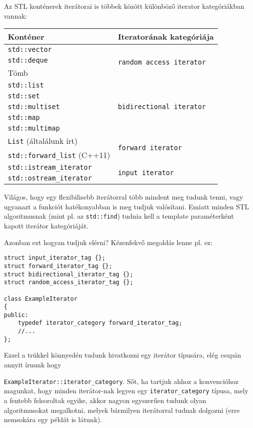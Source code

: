 \documentclass[../cpp_book/cpp_book.tex]{subfiles}
\begin{document}
	\smallskip
	Az STL konténerek iterátorai is többek között különböző iterator kategóriákban vannak:
	\begin{center}
		\setlength{\extrarowheight}{2pt}
		\begin{tabular}{|l|l|}
			\hline
			Konténer&Iteratorának kategóriája\\
			\hline
			\hline
			\texttt{std::vector} & \multirow{3}{*}{\texttt{random access iterator}}\\
			\texttt{std::deque} &\\
			Tömb &\\
			\hline
			\texttt{std::list} & \multirow{5}{*}{\texttt{bidirectional iterator}}\\
			\texttt{std::set} & \\
			\texttt{std::multiset} & \\
			\texttt{std::map} & \\
			\texttt{std::multimap} & \\
			\hline
			\texttt{List} (általálunk írt)& \multirow{2}{*}{\texttt{forward iterator}}\\
			\texttt{std::forward\_list} (C++11)&\\
			\hline
			\texttt{std::istream\_iterator}& \multirow{2}{*}{\texttt{input iterator}}\\
			\texttt{std::ostream\_iterator}&\\
			\hline
		\end{tabular}
	\end{center}
	Világos, hogy egy flexibilisebb iterátorral több mindent meg tudunk tenni, vagy ugyanazt a funkciót hatékonyabban is meg tudjuk valósítani. Emiatt minden STL algoritmusnak (mint pl. az \texttt{std::find}) tudnia kell a template paraméterként kapott iterátor kategóriáját.
	\medskip
	
	Azonban ezt hogyan tudjuk elérni? Kézenfekvő megoldás lenne pl. ez:
	\begin{lstlisting}
struct input_iterator_tag {};
struct forward_iterator_tag {};
struct bidirectional_iterator_tag {};
struct random_access_iterator_tag {};

class ExampleIterator
{
public:
	typedef iterator_category forward_iterator_tag;
	//...
};
	\end{lstlisting}
	Ezzel a trükkel könnyedén tudunk hivatkozni egy iterátor típusára, elég csupán annyit írnunk hogy 
	
	\texttt{ExampleIterator::iterator\_category}. Sőt, ha tartjuk ahhoz a konvencióhoz magunkat, hogy minden iterátor-nak legyen egy \texttt{iterator\_category} típusa, mely a fentebb felsoroltak egyike, akkor nagyon egyszerűen tudunk olyan algoritmusokat megalkotni, melyek bármilyen iterátorral tudnak dolgozni (erre nemsokára egy példát is látunk).
	
\end{document}
